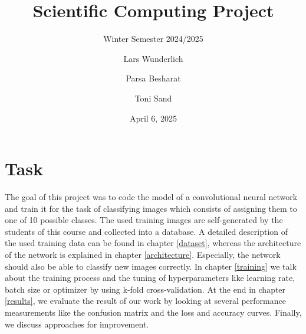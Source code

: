 \documentclass{tubaf-article}
\begin{document}
	\title{Scientific Computing Project}
	\subtitle{Winter Semester 2024/2025}
	\author{Lars Wunderlich \and Parsa Besharat \and Toni Sand}
	\date{April 6, 2025}
	\subject{Documentation}
	\publishers{TU Bergakademie Freiberg}
	
	\maketitle
	
	\tableofcontents
	
	\newpage
	
	\section{Task}
	
	The goal of this project was to code the model of a convolutional neural network and train it for the task of classifying images which consists of assigning them to one of 10 possible classes. The used training images are self-generated by the students of this course and collected into a database. A detailed description of the used training data can be found in chapter \ref{dataset}, whereas the architecture of the network is explained in chapter \ref{architecture}. Especially, the network should also be able to classify new images correctly. In chapter \ref{training} we talk about the training process and the tuning of hyperparameters like learning rate, batch size or optimizer by using k-fold cross-validation. At the end in chapter \ref{results}, we evaluate the result of our work by looking at several performance measurements like the confusion matrix and the loss and accuracy curves. Finally, we discuss approaches for improvement.
	
\end{document}
